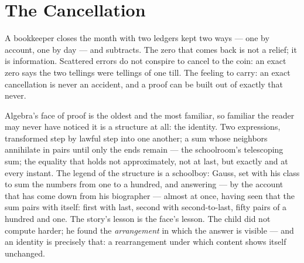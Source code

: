 \chapter{The Cancellation}

\begin{intuition}
A bookkeeper closes the month with two ledgers kept two ways --- one by
account, one by day --- and subtracts. The zero that comes back is not a
relief; it is information. Scattered errors do not conspire to cancel to
the coin: an exact zero says the two tellings were tellings of one till.
The feeling to carry: an exact cancellation is never an accident, and a
proof can be built out of exactly that never.
\end{intuition}

Algebra's face of proof is the oldest and the most familiar, so familiar
the reader may never have noticed it is a structure at all: the identity.
Two expressions, transformed step by lawful step into one another; a sum
whose neighbors annihilate in pairs until only the ends remain --- the
schoolroom's telescoping sum; the equality that holds not approximately,
not at last, but exactly and at every instant. The legend of the
structure is a schoolboy: Gauss, set with his class to sum the numbers
from one to a hundred, and answering --- by the account that has come
down from his biographer --- almost at once, having seen that the sum
pairs with itself: first with last, second with second-to-last, fifty
pairs of a hundred and one. The story's lesson is the face's lesson. The
child did not compute harder; he found the \emph{arrangement} in which
the answer is visible --- and an identity is precisely that: a
rearrangement under which content shows itself unchanged.

